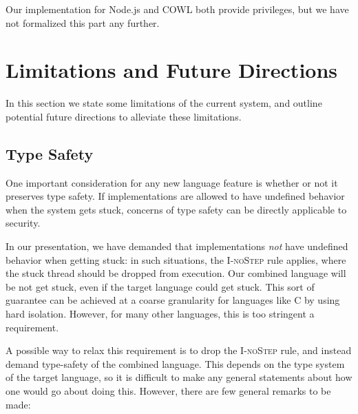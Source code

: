 Our implementation for Node.js and COWL both provide privileges, but
we have not formalized this part any further.
%


\section{Limitations and Future Directions}

In this section we state some limitations of the current system, and
outline potential future directions to alleviate these limitations.

\subsection{Type Safety}
\label{sec:extensions:types}

One important consideration for any new language feature is whether
or not it preserves type safety.  If implementations are allowed to
have undefined behavior when the system gets stuck, concerns of type
safety can be directly applicable to security.

In our presentation, we have demanded that implementations \emph{not}
have undefined behavior when getting stuck: in such situations, the
\textsc{I-noStep} rule applies, where the stuck thread should be dropped
from execution.  Our combined language will be not get stuck, even if
the target language could get stuck.  This sort of guarantee can be
achieved at a coarse granularity for languages like C by using hard
isolation.  However, for many other languages, this is too stringent a
requirement.

A possible way to relax this requirement is to drop the \textsc{I-noStep}
rule, and instead demand type-safety of the combined language.  This
depends on the type system of the target language, so it is difficult to
make any general statements about how one would go about doing this.  However,
there are few general remarks to be made:

